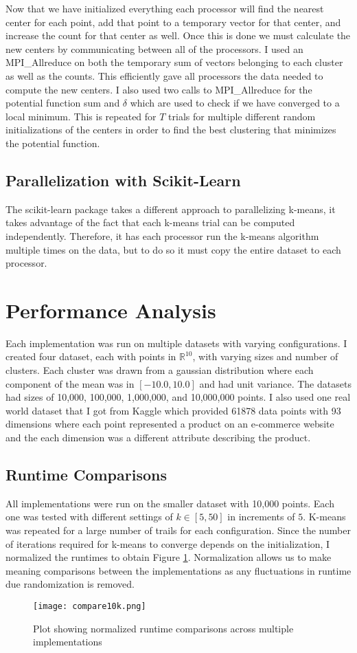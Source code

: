 \documentclass[10pt,twocolumn,letterpaper]{article}
\begin{document}
Now that we have initialized everything each processor will find the nearest center for each point, add that point to a temporary vector for that center, and increase the count for that center as well. Once this is done we must calculate the new centers by communicating between all of the processors. I used an MPI\_Allreduce on both the temporary sum of vectors belonging to each cluster as well as the counts. This efficiently gave all processors the data needed to compute the new centers. I also used two calls to MPI\_Allreduce for the potential function sum and $\delta$ which are used to check if we have converged to a local minimum. This is repeated for $T$ trials for multiple different random initializations of the centers in order to find the best clustering that minimizes the potential function.

\subsection{Parallelization with Scikit-Learn}
The scikit-learn package takes a different approach to parallelizing k-means, it takes advantage of the fact that each k-means trial can be computed independently. Therefore, it has each processor run the k-means algorithm multiple times on the data, but to do so it must copy the entire dataset to each processor. 

\section{Performance Analysis}
Each implementation was run on multiple datasets with varying configurations. I created four dataset, each with points in $\mathbb{R}^10$, with varying sizes and number of clusters. Each cluster was drawn from a gaussian distribution where each component of the mean was in $[-10.0, 10.0]$ and had unit variance. The datasets had sizes of 10,000, 100,000, 1,000,000, and 10,000,000 points. I also used one real world dataset that I got from Kaggle \cite{kaggle} which provided 61878 data points with 93 dimensions where each point represented a product on an e-commerce website and the each dimension was a different attribute describing the product. 

\subsection{Runtime Comparisons}
All implementations were run on the smaller dataset with 10,000 points. Each one was tested with different settings of $k \in [5, 50]$ in increments of $5$. K-means was repeated for a large number of trails for each configuration. Since the number of iterations required for k-means to converge depends on the initialization, I normalized the runtimes to obtain Figure \ref{fig:comp1}. Normalization allows us to make meaning comparisons between the implementations as any fluctuations in runtime due randomization is removed. 
\begin{figure}[!t]
\centering
\texttt{[image: compare10k.png]}
\caption{Plot showing normalized runtime comparisons across multiple implementations}
\label{fig:comp1}
\end{figure}
\end{document}
